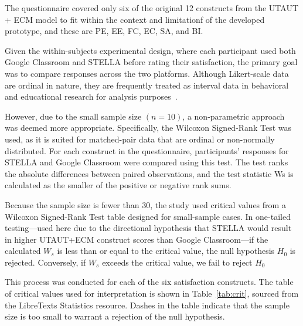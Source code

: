 \documentclass[sigconf,natbib=true]{acmart}
\begin{document}
 The questionnaire covered only six of the original 12 constructs from the UTAUT + ECM model to fit within the context and limitationf of the developed prototype, and these are PE, EE, FC, EC, SA, and BI\@. 

 Given the within-subjects experimental design, where each participant used both Google Classroom and STELLA before rating their satisfaction, the primary goal was to compare responses across the two platforms. Although Likert-scale data are ordinal in nature, they are frequently treated as interval data in behavioral and educational research for analysis purposes~\cite{normanLikertScalesLevels2010}. 
 
 However, due to the small sample size $(n = 10)$, a non-parametric approach was
 deemed more appropriate. Specifically, the Wilcoxon Signed-Rank Test was used,
 as it is suited for matched-pair data that are ordinal or non-normally
 distributed. For each construct in the questionnaire, participants' responses
 for STELLA and Google Classroom were compared using this test. The test ranks
 the absolute differences between paired observations, and the test statistic Ws
 is calculated as the smaller of the positive or negative rank sums.

 Because the sample size is fewer than 30, the study used critical values from
 a Wilcoxon Signed-Rank Test table designed for small-sample cases. In
 one-tailed testing---used here due to the directional hypothesis that STELLA
 would result in higher UTAUT+ECM construct scores than Google Classroom---if the calculated
 $W_s$ is less than or equal to the critical value, the null hypothesis $H_0$ is
 rejected. Conversely, if $W_s$ exceeds the critical value, we fail to reject $H_0$

 This process was conducted for each of the six satisfaction constructs. The
 table of critical values used for interpretation is shown in Table~\ref{tab:crit}, sourced
 from the LibreTexts Statistics resource. Dashes in the table indicate that the
 sample size is too small to warrant a rejection of the null hypothesis.
\end{document}
